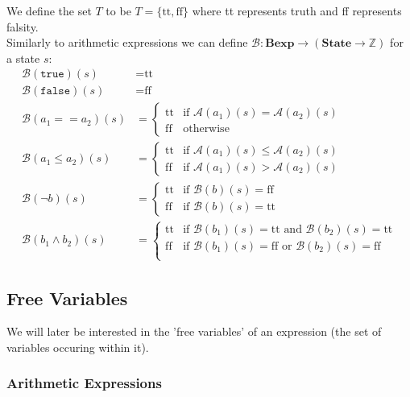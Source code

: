 \documentclass[a4paper, 12pt, twoside]{article}
\begin{document}
We define the set $T$ to be $T = \{\text{tt}, \text{ff}\}$ where tt represents
truth and ff represents falsity.
\\[\baselineskip]
Similarly to arithmetic expressions we can define $\mathcal{B} : \textbf{Bexp}
\to (\textbf{State} \to \mathbb{Z})$ for a state $s$: \begin{align*}
  \mathcal{B}(\texttt{true})(s) &= \text{tt} \\
  \mathcal{B}(\texttt{false})(s) &= \text{ff} \\
  \mathcal{B}(a_1 == a_2)(s) &= \begin{cases}
      \text{tt} & \text{if } \mathcal{A}(a_1)(s) = \mathcal{A}(a_2)(s) \\
      \text{ff} & \text{otherwise}
  \end{cases} \\
  \mathcal{B}(a_1 \leq a_2)(s) &= \begin{cases}
    \text{tt} & \text{if } \mathcal{A}(a_1)(s) \leq \mathcal{A}(a_2)(s) \\
    \text{ff} & \text{if } \mathcal{A}(a_1)(s) > \mathcal{A}(a_2)(s)
  \end{cases} \\
  \mathcal{B}(\neg b)(s) &= \begin{cases}
    \text{tt} & \text{if } \mathcal{B}(b)(s) = \text{ff} \\
    \text{ff} & \text{if } \mathcal{B}(b)(s) = \text{tt}
  \end{cases} \\
  \mathcal{B}(b_1 \land b_2)(s) &= \begin{cases}
    \text{tt} & \text{if } \mathcal{B}(b_1)(s) = \text{tt} \text{ and } \mathcal{B}(b_2)(s) = \text{tt} \\
    \text{ff} & \text{if } \mathcal{B}(b_1)(s) = \text{ff} \text{ or } \mathcal{B}(b_2)(s) = \text{ff} \\
  \end{cases}
\end{align*}

\subsection{Free Variables}

We will later be interested in the 'free variables' of an expression 
(the set of variables occuring within it).

\subsubsection{Arithmetic Expressions}
\end{document}
